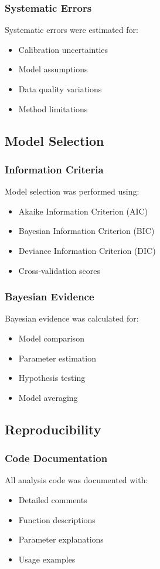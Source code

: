 \subsubsection{Systematic Errors}
Systematic errors were estimated for:
\begin{itemize}
    \item Calibration uncertainties
    \item Model assumptions
    \item Data quality variations
    \item Method limitations
\end{itemize}

\subsection{Model Selection}

\subsubsection{Information Criteria}
Model selection was performed using:
\begin{itemize}
    \item Akaike Information Criterion (AIC)
    \item Bayesian Information Criterion (BIC)
    \item Deviance Information Criterion (DIC)
    \item Cross-validation scores
\end{itemize}

\subsubsection{Bayesian Evidence}
Bayesian evidence was calculated for:
\begin{itemize}
    \item Model comparison
    \item Parameter estimation
    \item Hypothesis testing
    \item Model averaging
\end{itemize}

\subsection{Reproducibility}

\subsubsection{Code Documentation}
All analysis code was documented with:
\begin{itemize}
    \item Detailed comments
    \item Function descriptions
    \item Parameter explanations
    \item Usage examples
\end{itemize}

